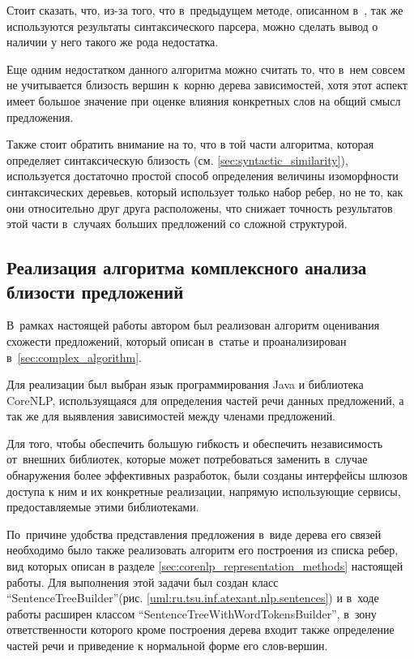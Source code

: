 Стоит сказать, что, из-за того, что в~предыдущем методе, описанном в~\cite{weightedDep},
так же используются результаты синтаксического парсера, можно сделать вывод
о наличии у него такого же рода недостатка.

Еще одним недостатком данного алгоритма можно считать то, что в~нем совсем
не учитывается близость вершин к~корню дерева зависимостей, хотя этот аспект
имеет большое значение при оценке влияния конкретных слов на общий смысл
предложения.

Также стоит обратить внимание на то, что в той части алгоритма, 
которая определяет синтаксическую близость (см. \ref{sec:syntactic_similarity}),
используется достаточно простой способ определения величины изоморфности
синтаксических деревьев, который использует только набор ребер, но не то,
как они относительно друг друга расположены, что снижает точность
результатов этой части в~случаях больших предложений со сложной структурой.

\subsection{Реализация алгоритма комплексного анализа близости предложений}
В~рамках настоящей работы автором был реализован алгоритм оценивания
схожести предложений, который описан в~статье\cite{complexSim} и
проанализирован в~\ref{sec:complex_algorithm}.

Для реализации был выбран язык программирования Java и библиотека CoreNLP\cite{corenlp},
используящаяся для определения частей речи данных предложений, а так же для выявления зависимостей
между членами предложений.

Для того, чтобы обеспечить большую гибкость и обеспечить независимость от~внешних библиотек,
которые может потребоваться заменить в~случае обнаружения более эффективных разработок,
были созданы интерфейсы шлюзов доступа к ним и их конкретные реализации, напрямую
использующие сервисы, предоставляемые этими библиотеками.

По~причине удобства представления предложения в~виде дерева его связей
необходимо было также реализовать алгоритм его построения из списка ребер, 
вид которых описан в разделе \ref{sec:corenlp_representation_methods} настоящей работы.
Для выполнения этой задачи был создан класс ``SentenceTreeBuilder''(рис. \ref{uml:ru.tsu.inf.atexant.nlp.sentences}) и в~ходе работы расширен
классом ``SentenceTreeWithWordTokensBuilder'', в~зону ответственности которого
кроме построения дерева входит также определение частей речи и приведение к нормальной форме
его слов-вершин.

